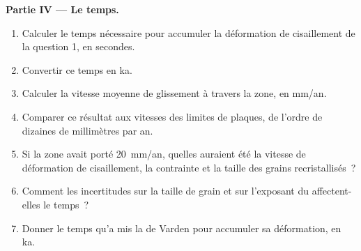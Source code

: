 \begin{problem}
\medskip\noindent\textbf{Partie IV --- Le temps.}
\begin{enumerate}[resume]
  \item Calculer le temps nécessaire pour accumuler la déformation de cisaillement de la question 1,
        en secondes.
  \item Convertir ce temps en ka.
  \item Calculer la vitesse moyenne de glissement à travers la zone, en \unit{mm/an}.
  \item Comparer ce résultat aux vitesses des limites de plaques, de l'ordre de dizaines de millimètres par an.
  \item Si la zone avait porté \qty{20}{mm/an}, quelles auraient été la vitesse
        de déformation de cisaillement, la contrainte et la taille des grains recristallisés~?
  \item Comment les incertitudes sur la taille de grain et sur l'exposant
        du  affectent-elles le temps~?
  \item Donner le temps qu'a mis la  de Varden pour accumuler sa déformation, en
        ka.
\end{enumerate}
\end{problem}
